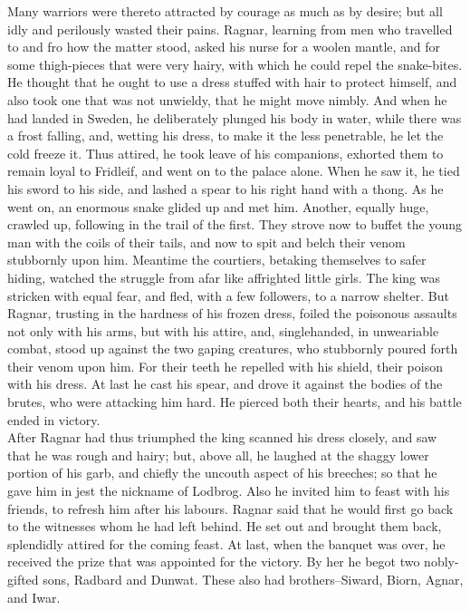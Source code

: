 \documentclass[10pt,a4paper]{report}
\begin{document}
Many warriors were thereto attracted by courage as much as by desire; but all idly and perilously wasted their pains. Ragnar, learning from men who travelled to and fro how the matter stood, asked his nurse for a woolen mantle, and for some thigh-pieces that were very hairy, with which he could repel the snake-bites. He thought that he ought to use a dress stuffed with hair to protect himself, and also took one that was not unwieldy, that he might move nimbly. And when he had landed in Sweden, he deliberately plunged his body in water, while there was a frost falling, and, wetting his dress, to make it the less penetrable, he let the cold freeze it. Thus attired, he took leave of his companions, exhorted them to remain loyal to Fridleif, and went on to the palace alone. When he saw it, he tied his sword to his side, and lashed a spear to his right hand with a thong. As he went on, an enormous snake glided up and met him. Another, equally huge, crawled up, following in the trail of the first. They strove now to buffet the young man with the coils of their tails, and now to spit and belch their venom stubbornly upon him. Meantime the courtiers, betaking themselves to safer hiding, watched the struggle from afar like affrighted little girls. The king was stricken with equal fear, and fled, with a few followers, to a narrow shelter. But Ragnar, trusting in the hardness of his frozen dress, foiled the poisonous assaults not only with his arms, but with his attire, and, singlehanded, in unweariable combat, stood up against the two gaping creatures, who stubbornly poured forth their venom upon him. For their teeth he repelled with his shield, their poison with his dress. At last he cast his spear, and drove it against the bodies of the brutes, who were attacking him hard. He pierced both their hearts, and his battle ended in victory.\\

After Ragnar had thus triumphed the king scanned his dress closely, and saw that he was rough and hairy; but, above all, he laughed at the shaggy lower portion of his garb, and chiefly the uncouth aspect of his breeches; so that he gave him in jest the nickname of Lodbrog. Also he invited him to feast with his friends, to refresh him after his labours. Ragnar said that he would first go back to the witnesses whom he had left behind. He set out and brought them back, splendidly attired for the coming feast. At last, when the banquet was over, he received the prize that was appointed for the victory. By her he begot two nobly-gifted sons, Radbard and Dunwat. These also had brothers--Siward, Biorn, Agnar, and Iwar.\\
\end{document}
